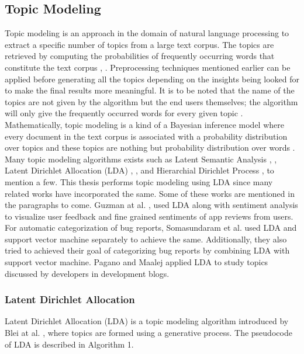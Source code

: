 \documentclass[a4paper,12pt,twoside]{report}
\begin{document}
\subsection{Topic Modeling}
Topic modeling is an approach in the domain of natural language processing to extract a specific number of topics from a large text corpus. The topics are retrieved by computing the probabilities of frequently occurring words that constitute the text corpus \cite{Zou2017}, \cite{Linstead2007}. Preprocessing techniques mentioned earlier can be applied before generating all the topics depending on the insights being looked for to make the final results more meaningful. It is to be noted that the name of the topics are not given by the algorithm but the end users themselves; the algorithm will only give the frequently occurred words for every given topic \cite{Goel2017}.
\newline \newline
Mathematically, topic modeling is a kind of a Bayesian inference model where every document in the text corpus is associated with a probability distribution over topics and these topics are nothing but probability distribution over words \cite{Goel2017}. Many topic modeling algorithms exists such as Latent Semantic Analysis \cite{Agung2017}, \cite{Tu2017}, Latent Dirichlet Allocation (\acs{LDA}) \cite{Katsumata2016}, \cite{Chen2016}, and Hierarchial Dirichlet Process \cite{Li2018}, \cite{Hu2017} to mention a few. This thesis performs topic modeling using \acs{LDA} since many related works have incorporated the same. Some of these works are mentioned in the paragraphs to come. 
\newline \newline
Guzman at al. \cite{Guzman2015}, \cite{Guzman2014} used \acs{LDA} along with sentiment analysis to visualize user feedback and fine grained sentiments of app reviews from users. For automatic categorization of bug reports, Somasundaram et al. \cite{Somasundaram2012} used \acs{LDA} and support vector machine separately to achieve the same. Additionally, they also tried to achieved their goal of categorizing bug reports by combining \acs{LDA} with support vector machine. Pagano and Maalej\cite{Pagano2011} applied \acs{LDA} to study topics discussed by developers in development blogs. 

\subsubsection{Latent Dirichlet Allocation}
Latent Dirichlet Allocation (\acs{LDA}) is a topic modeling algorithm introduced by Blei at al. \cite{Blei2003}, where topics are formed using a generative process. The pseudocode of \acs{LDA}\cite{Goel2017} is described in Algorithm 1.
\end{document}
